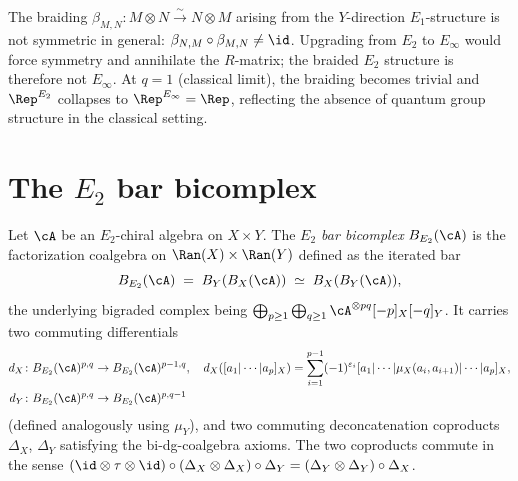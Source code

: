 \begin{remark}
\label{rem:thy-e2-not-einf}
The braiding $\beta_{M,N}\colon M\otimes N\xrightarrow{\sim}N\otimes M$
arising from the $Y$-direction $E_1$-structure is not symmetric in general:
$\beta_{N,M}\circ\beta_{M,N}\ne\id$. Upgrading from $E_2$ to $E_\infty$
would force symmetry and annihilate the $R$-matrix; the braided $E_2$
structure is therefore not $E_\infty$.
At $q=1$ (classical limit), the braiding becomes trivial and $\Rep^{E_2}$
collapses to $\Rep^{E_\infty}=\Rep$, reflecting the absence of quantum group
structure in the classical setting.
\end{remark}

\section{The \texorpdfstring{$E_2$}{E-2} bar bicomplex}
\label{sec:thy-e2-bar-bicomplex}

\begin{definition}
\label{def:thy-e2-bar-bicomplex}
Let $\cA$ be an $E_2$-chiral algebra on $X\times Y$. The
\emph{$E_2$ bar bicomplex} $B_{E_2}(\cA)$ is the factorization
coalgebra on $\Ran(X)\times\Ran(Y)$ defined as the iterated bar
\[
B_{E_2}(\cA)\;=\;B_Y(B_X(\cA))\;\simeq\;B_X(B_Y(\cA)),
\]
the underlying bigraded complex being
$\bigoplus_{p\geq 1}\bigoplus_{q\geq 1}\cA^{\otimes pq}[-p]_X[-q]_Y$.
It carries two commuting differentials
\begin{align*}
d_X &\colon B_{E_2}(\cA)^{p,q}\to B_{E_2}(\cA)^{p-1,q},\quad
d_X([a_1|\cdots|a_p]_X)=\sum_{i=1}^{p-1}(-1)^{\varepsilon_i}
[a_1|\cdots|\mu_X(a_i,a_{i+1})|\cdots|a_p]_X,\\
d_Y &\colon B_{E_2}(\cA)^{p,q}\to B_{E_2}(\cA)^{p,q-1}
\end{align*}
(defined analogously using $\mu_Y$), and two commuting deconcatenation
coproducts $\Delta_X$, $\Delta_Y$ satisfying the bi-dg-coalgebra axioms.
The two coproducts commute in the sense
$(\id\otimes\tau\otimes\id)\circ(\Delta_X\otimes\Delta_X)\circ\Delta_Y
=(\Delta_Y\otimes\Delta_Y)\circ\Delta_X$.
\end{definition}

